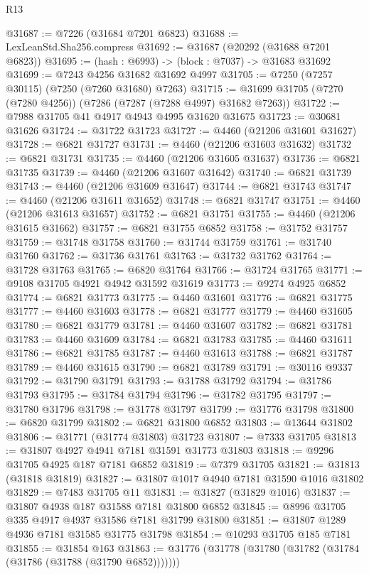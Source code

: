 \begin{lexlean}{R13}
\begin{coremodule}
@31687 := @7226 (@31684 @7201 @6823)
@31688 := LexLeanStd.Sha256.compress
@31692 := @31687 (@20292 (@31688 @7201 @6823))
@31695 := (hash : @6993) -> (block : @7037) -> @31683 @31692
@31699 := @7243 @4256 @31682 @31692 @4997
@31705 := @7250 (@7257 @30115) (@7250 (@7260 @31680) @7263)
@31715 := @31699 @31705 (@7270 (@7280 @4256)) (@7286 (@7287 (@7288 @4997) @31682 @7263))
@31722 := @7988 @31705 @41 @4917 @4943 @4995 @31620 @31675
@31723 := @30681 @31626
@31724 := @31722 @31723
@31727 := @4460 (@21206 @31601 @31627)
@31728 := @6821 @31727
@31731 := @4460 (@21206 @31603 @31632)
@31732 := @6821 @31731
@31735 := @4460 (@21206 @31605 @31637)
@31736 := @6821 @31735
@31739 := @4460 (@21206 @31607 @31642)
@31740 := @6821 @31739
@31743 := @4460 (@21206 @31609 @31647)
@31744 := @6821 @31743
@31747 := @4460 (@21206 @31611 @31652)
@31748 := @6821 @31747
@31751 := @4460 (@21206 @31613 @31657)
@31752 := @6821 @31751
@31755 := @4460 (@21206 @31615 @31662)
@31757 := @6821 @31755 @6852
@31758 := @31752 @31757
@31759 := @31748 @31758
@31760 := @31744 @31759
@31761 := @31740 @31760
@31762 := @31736 @31761
@31763 := @31732 @31762
@31764 := @31728 @31763
@31765 := @6820 @31764
@31766 := @31724 @31765
@31771 := @9108 @31705 @4921 @4942 @31592 @31619
@31773 := @9274 @4925 @6852
@31774 := @6821 @31773
@31775 := @4460 @31601
@31776 := @6821 @31775
@31777 := @4460 @31603
@31778 := @6821 @31777
@31779 := @4460 @31605
@31780 := @6821 @31779
@31781 := @4460 @31607
@31782 := @6821 @31781
@31783 := @4460 @31609
@31784 := @6821 @31783
@31785 := @4460 @31611
@31786 := @6821 @31785
@31787 := @4460 @31613
@31788 := @6821 @31787
@31789 := @4460 @31615
@31790 := @6821 @31789
@31791 := @30116 @9337
@31792 := @31790 @31791
@31793 := @31788 @31792
@31794 := @31786 @31793
@31795 := @31784 @31794
@31796 := @31782 @31795
@31797 := @31780 @31796
@31798 := @31778 @31797
@31799 := @31776 @31798
@31800 := @6820 @31799
@31802 := @6821 @31800 @6852
@31803 := @13644 @31802
@31806 := @31771 (@31774 @31803) @31723
@31807 := @7333 @31705
@31813 := @31807 @4927 @4941 @7181 @31591 @31773 @31803
@31818 := @9296 @31705 @4925 @187 @7181 @6852
@31819 := @7379 @31705
@31821 := @31813 (@31818 @31819)
@31827 := @31807 @1017 @4940 @7181 @31590 @1016 @31802
@31829 := @7483 @31705 @11
@31831 := @31827 (@31829 @1016)
@31837 := @31807 @4938 @187 @31588 @7181 @31800 @6852
@31845 := @8996 @31705 @335 @4917 @4937 @31586 @7181 @31799 @31800
@31851 := @31807 @1289 @4936 @7181 @31585 @31775 @31798
@31854 := @10293 @31705 @185 @7181
@31855 := @31854 @163
@31863 := @31776 (@31778 (@31780 (@31782 (@31784 (@31786 (@31788 (@31790 @6852)))))))

\end{coremodule}
\end{lexlean}
